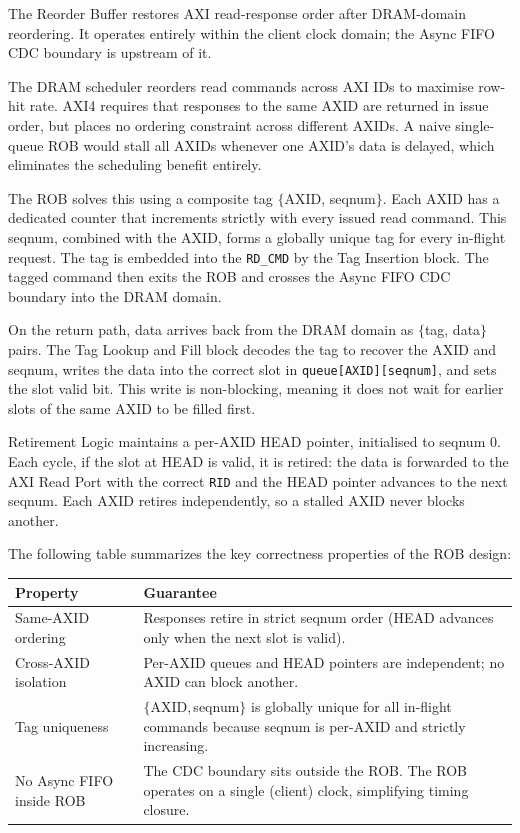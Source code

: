 \documentclass[10pt]{article}
\begin{document}
The Reorder Buffer restores AXI read-response order after DRAM-domain reordering. It operates entirely within the client clock domain; the Async FIFO CDC boundary is upstream of it.

The DRAM scheduler reorders read commands across AXI IDs to maximise row-hit rate. AXI4 requires that responses to the same AXID are returned in issue order, but places no ordering constraint across different AXIDs. A naive single-queue ROB would stall all AXIDs whenever one AXID's data is delayed, which eliminates the scheduling benefit entirely.

The ROB solves this using a composite tag $\{$AXID, seqnum$\}$. Each AXID has a dedicated counter that increments strictly with every issued read command. This seqnum, combined with the AXID, forms a globally unique tag for every in-flight request. The tag is embedded into the \texttt{RD\_CMD} by the Tag Insertion block. The tagged command then exits the ROB and crosses the Async FIFO CDC boundary into the DRAM domain.

On the return path, data arrives back from the DRAM domain as $\{$tag, data$\}$ pairs. The Tag Lookup and Fill block decodes the tag to recover the AXID and seqnum, writes the data into the correct slot in \texttt{queue[AXID][seqnum]}, and sets the slot valid bit. This write is non-blocking, meaning it does not wait for earlier slots of the same AXID to be filled first.

Retirement Logic maintains a per-AXID HEAD pointer, initialised to seqnum 0. Each cycle, if the slot at HEAD is valid, it is retired: the data is forwarded to the AXI Read Port with the correct \texttt{RID} and the HEAD pointer advances to the next seqnum. Each AXID retires independently, so a stalled AXID never blocks another.

The following table summarizes the key correctness properties of the ROB design:

\begin{tabular}{p{4.2cm} p{13.5cm}}
\toprule
\textbf{Property} & \textbf{Guarantee} \\
\midrule
Same-AXID ordering & Responses retire in strict seqnum order (HEAD advances
                     only when the next slot is valid). \\[3pt]
Cross-AXID isolation & Per-AXID queues and HEAD pointers are independent;
                       no AXID can block another. \\[3pt]
Tag uniqueness & $\{$AXID,\,seqnum$\}$ is globally unique for all in-flight
                 commands because seqnum is per-AXID and strictly increasing. \\[3pt]
No Async FIFO inside ROB & The CDC boundary sits outside the ROB. The ROB
                           operates on a single (client) clock, simplifying
                           timing closure. \\
\bottomrule
\end{tabular}
\end{document}
